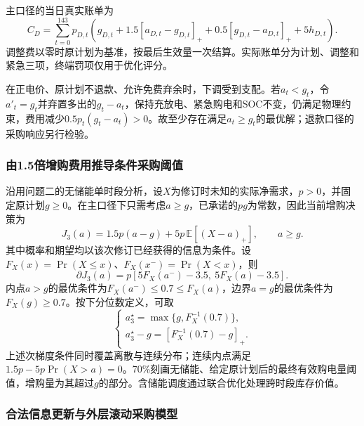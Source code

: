 主口径的当日真实账单为
\begin{equation}
 C_D=\sum_{t=0}^{143}p_{D,t}\left(g_{D,t}+1.5[a_{D,t}-g_{D,t}]_+
 +0.5[g_{D,t}-a_{D,t}]_++5h_{D,t}\right).
 \label{eq:settlement}
\end{equation}
调整费以零时原计划为基准，按最后生效量一次结算。实际账单分为计划、调整和紧急三项，终端罚项仅用于优化评分。

在正电价、原计划不退款、允许免费弃余时，下调受到支配。若$a_t<g_t$，令$a'_t=g_t$并弃置多出的$g_t-a_t$，保持充放电、紧急购电和SOC不变，仍满足物理约束，费用减少$0.5p_t(g_t-a_t)>0$。故至少存在满足$a_t\ge g_t$的最优解；退款口径的采购响应另行检验。

\subsubsection{由1.5倍增购费用推导条件采购阈值}

沿用问题二的无储能单时段分析，设$X$为修订时未知的实际净需求，$p>0$，并固定原计划$g\ge0$。在主口径下只需考虑$a\ge g$，已承诺的$pg$为常数，因此当前增购决策为
\begin{equation}
 J_3(a)=1.5p(a-g)+5p\,\mathbb E[(X-a)_+],\qquad a\ge g.
 \label{eq:mech_q3_cost}
\end{equation}
其中概率和期望均以该次修订已经获得的信息为条件。设$F_X(x)=\Pr(X\le x)$、$F_X(x^-)=\Pr(X<x)$，则
\begin{equation}
 \partial J_3(a)=p[5F_X(a^-)-3.5,\ 5F_X(a)-3.5].
 \label{eq:q3_adjustment_subgradient}
\end{equation}
内点$a>g$的最优条件为$F_X(a^-)\le0.7\le F_X(a)$，边界$a=g$的最优条件为$F_X(g)\ge0.7$。按下分位数定义，可取
\begin{equation}
 \begin{cases}
 a_3^\star=\max\{g,F_X^{-1}(0.7)\},\\[2pt]
 a_3^\star-g=[F_X^{-1}(0.7)-g]_+.
 \end{cases}
 \label{eq:mech_q3_quantile}
\end{equation}
上述次梯度条件同时覆盖离散与连续分布；连续内点满足$1.5p-5p\Pr(X>a)=0$。70\%刻画无储能、给定原计划后的最终有效购电量阈值，增购量为其超过$g$的部分。含储能调度通过联合优化处理跨时段库存价值。

\subsubsection{合法信息更新与外层滚动采购模型}

